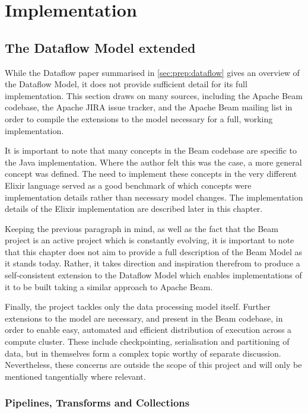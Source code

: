 \chapter{Implementation}\label{ch:impl}

\section{The Dataflow Model extended}\label{sec:impl:dataflow}

While the Dataflow paper \cite{Akidau:2015} summarised in \cref{sec:prep:dataflow} gives an overview of the Dataflow Model, it does not provide sufficient detail for its full implementation.
This section draws on many sources, including the Apache Beam codebase, the Apache JIRA issue tracker, and the Apache Beam mailing list in order to compile the extensions to the model necessary for a full, working implementation.

It is important to note that many concepts in the Beam codebase are specific to the Java implementation.
Where the author felt this was the case, a more general concept was defined.
The need to implement these concepts in the very different Elixir language served as a good benchmark of which concepts were implementation details rather than necessary model changes.
The implementation details of the Elixir implementation are described later in this chapter.

Keeping the previous paragraph in mind, as well as the fact that the Beam project is an active project which is constantly evolving, it is important to note that this chapter does not aim to provide a full description of the Beam Model as it stands today.
Rather, it takes direction and inspiration therefrom to produce a self-consistent extension to the Dataflow Model which enables implementations of it to be built taking a similar approach to Apache Beam.

Finally, the project tackles only the data processing model itself.
Further extensions to the model are necessary, and present in the Beam codebase, in order to enable easy, automated and efficient distribution of execution across a compute cluster.
These include checkpointing, serialisation and partitioning of data, but in themselves form a complex topic worthy of separate discussion.
Nevertheless, these concerns are outside the scope of this project and will only be mentioned tangentially where relevant.

\subsection{Pipelines, Transforms and Collections}\label{sec:impl:dataflow:pipelines-transforms-collections}

